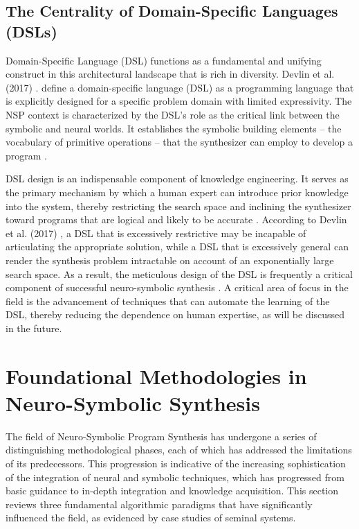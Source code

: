 \documentclass[12pt, a4paper]{report}
\begin{document}
\subsection{The Centrality of Domain-Specific Languages (DSLs)}
Domain-Specific Language (DSL) functions as a fundamental and unifying construct in this architectural landscape that is rich in diversity.  Devlin et al. (2017) \citep{devlin2017robustfill}. define a domain-specific language (DSL) as a programming language that is explicitly designed for a specific problem domain with limited expressivity. The NSP context is characterized by the DSL's role as the critical link between the symbolic and neural worlds. It establishes the symbolic building elements -- the vocabulary of primitive operations -- that the synthesizer can employ to develop a program \citep{gulwani2017program}. 

DSL design is an indispensable component of knowledge engineering. It serves as the primary mechanism by which a human expert can introduce prior knowledge into the system, thereby restricting the search space and inclining the synthesizer toward programs that are logical and likely to be accurate \citep{knoth2023type}. According to Devlin et al. (2017) \citep{devlin2017robustfill}, a DSL that is excessively restrictive may be incapable of articulating the appropriate solution, while a DSL that is excessively general can render the synthesis problem intractable on account of an exponentially large search space. As a result, the meticulous design of the DSL is frequently a critical component of successful neuro-symbolic synthesis \citep{knoth2023type}. A critical area of focus in the field is the advancement of techniques that can automate the learning of the DSL, thereby reducing the dependence on human expertise, as will be discussed in the future.

\section{Foundational Methodologies in Neuro-Symbolic Synthesis}

The field of Neuro-Symbolic Program Synthesis has undergone a series of distinguishing methodological phases, each of which has addressed the limitations of its predecessors. This progression is indicative of the increasing sophistication of the integration of neural and symbolic techniques, which has progressed from basic guidance to in-depth integration and knowledge acquisition. This section reviews three fundamental algorithmic paradigms that have significantly influenced the field, as evidenced by case studies of seminal systems.
\end{document}
